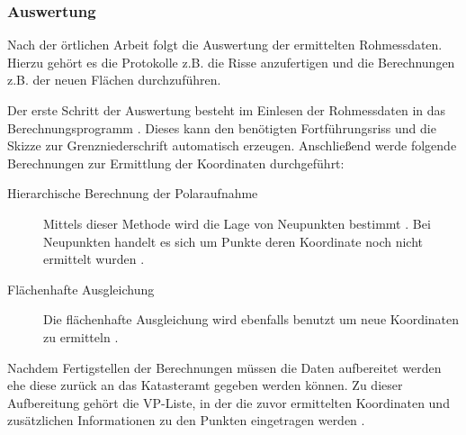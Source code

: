 
\subsubsection{Auswertung} \label{subsubsec:auswertung}

Nach der örtlichen Arbeit folgt die Auswertung der ermittelten Rohmessdaten. Hierzu gehört es die Protokolle z.B. die Risse anzufertigen und die Berechnungen z.B. der neuen Flächen durchzuführen. 

Der erste Schritt der Auswertung besteht im Einlesen der Rohmessdaten in das Berechnungsprogramm . Dieses kann den benötigten Fortführungsriss und die Skizze zur Grenzniederschrift automatisch erzeugen.
Anschließend werde folgende Berechnungen zur Ermittlung der Koordinaten durchgeführt:
\begin{description}
	\item[Hierarchische Berechnung der Polaraufnahme] Mittels dieser Methode wird die Lage von Neupunkten bestimmt \autocite[vgl.][]{wiki-polaraufnahme}. Bei Neupunkten handelt es sich um Punkte deren Koordinate noch nicht ermittelt wurden \autocite[vgl.][]{wiki-neupunkt}.  
	\item[Flächenhafte Ausgleichung] Die flächenhafte Ausgleichung wird ebenfalls benutzt um neue Koordinaten zu ermitteln  \autocite[vgl.][6]{bezk-ausgleichung}.
\end{description}

Nachdem Fertigstellen der Berechnungen müssen die Daten aufbereitet werden ehe diese zurück an das Katasteramt gegeben werden können.
Zu dieser Aufbereitung gehört die \ac{VP-Liste}, in der die zuvor ermittelten Koordinaten und zusätzlichen Informationen zu den Punkten eingetragen werden \autocite[vgl.][62]{bezk-vp-liste}.

